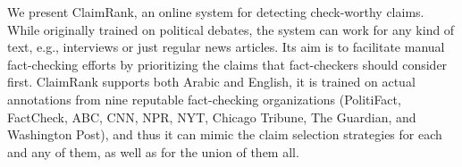 We present ClaimRank, an online system for detecting check-worthy claims. While originally trained on political debates, the system can work for any kind of text, e.g., interviews or just regular news articles. Its aim is to facilitate manual fact-checking efforts by prioritizing the claims that fact-checkers should consider first. ClaimRank supports both Arabic and English, it is trained on actual annotations from nine reputable fact-checking organizations (PolitiFact, FactCheck, ABC, CNN, NPR, NYT, Chicago Tribune, The Guardian, and Washington Post), and thus it can mimic the claim selection strategies for each and any of them, as well as for the union of them all.
